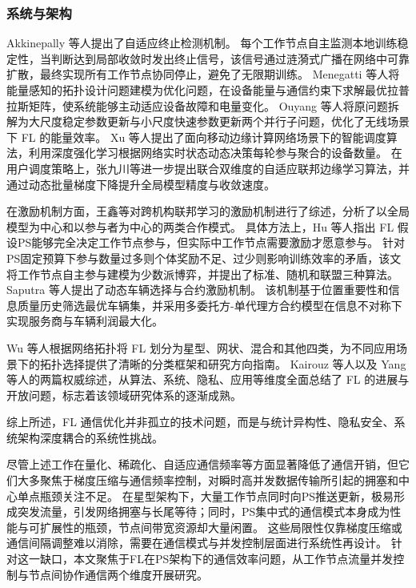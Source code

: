 \documentclass[master, vlined]{DissertUESTC}
\begin{document}
	\subsubsection{系统与架构}

	Akkinepally 等人提出了自适应终止检测机制。
	每个工作节点自主监测本地训练稳定性，当判断达到局部收敛时发出终止信号，该信号通过涟漪式广播在网络中可靠扩散，最终实现所有工作节点协同停止，避免了无限期训练。
	Menegatti 等人将能量感知的拓扑设计问题建模为优化问题，在设备能量与通信约束下求解最优拉普拉斯矩阵，使系统能够主动适应设备故障和电量变化。
	Ouyang 等人将原问题拆解为大尺度稳定参数更新与小尺度快速参数更新两个并行子问题，优化了无线场景下 FL 的能量效率。
	Xu 等人提出了面向移动边缘计算网络场景下的智能调度算法，利用深度强化学习根据网络实时状态动态决策每轮参与聚合的设备数量。
	在用户调度策略上，张九川等进一步提出联合双维度的自适应联邦边缘学习算法，并通过动态批量梯度下降提升全局模型精度与收敛速度。

	在激励机制方面，王鑫等对跨机构联邦学习的激励机制进行了综述，分析了以全局模型为中心和以参与者为中心的两类合作模式。
	具体方法上，Hu 等人指出 FL 假设PS能够完全决定工作节点参与，但实际中工作节点需要激励才愿意参与。
	针对PS固定预算下参与数量过多则个体奖励不足、过少则影响训练效率的矛盾，该文将工作节点自主参与建模为少数派博弈，并提出了标准、随机和联盟三种算法。
	Saputra 等人提出了动态车辆选择与合约激励机制。
	该机制基于位置重要性和信息质量历史筛选最优车辆集，并采用多委托方-单代理方合约模型在信息不对称下实现服务商与车辆利润最大化。

	Wu 等人根据网络拓扑将 FL 划分为星型、网状、混合和其他四类，为不同应用场景下的拓扑选择提供了清晰的分类框架和研究方向指南。
	Kairouz 等人以及 Yang 等人的两篇权威综述，从算法、系统、隐私、应用等维度全面总结了 FL 的进展与开放问题，标志着该领域研究体系的逐渐成熟。

	综上所述，FL 通信优化并非孤立的技术问题，而是与统计异构性、隐私安全、系统架构深度耦合的系统性挑战。

	尽管上述工作在量化、稀疏化、自适应通信频率等方面显著降低了通信开销，但它们大多聚焦于梯度压缩与通信频率控制，对瞬时高并发数据传输所引起的拥塞和中心单点瓶颈关注不足。
	在星型架构下，大量工作节点同时向PS推送更新，极易形成突发流量，引发网络拥塞与长尾等待；同时，PS集中式的通信模式本身成为性能与可扩展性的瓶颈，节点间带宽资源却大量闲置。
	这些局限性仅靠梯度压缩或通信间隔调整难以消除，需要在通信模式与并发控制层面进行系统性再设计。
	针对这一缺口，本文聚焦于FL在PS架构下的通信效率问题，从工作节点流量并发控制与节点间协作通信两个维度开展研究。
\end{document}
